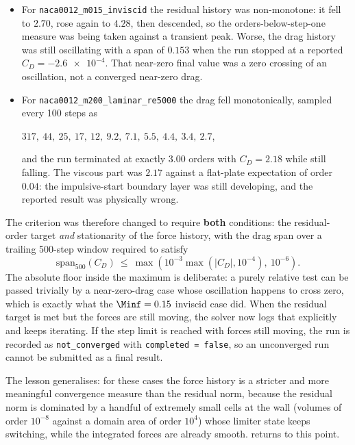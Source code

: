 \begin{itemize}
  \item For \texttt{naca0012\_m015\_inviscid} the residual history was
  non-monotone: it fell to $2.70$, rose again to $4.28$, then descended, so the
  orders-below-step-one measure was being taken against a transient peak. Worse,
  the drag history was still oscillating with a span of $0.153$ when the run
  stopped at a reported $C_D=\num{-2.6e-4}$. That near-zero final value was a
  zero crossing of an oscillation, not a converged near-zero drag.
  \item For \texttt{naca0012\_m200\_laminar\_re5000} the drag fell monotonically,
  sampled every 100 steps as
  \begin{center}
    $317,\ 44,\ 25,\ 17,\ 12,\ 9.2,\ 7.1,\ 5.5,\ 4.4,\ 3.4,\ 2.7$,
  \end{center}
  and the run terminated at exactly $3.00$ orders with $C_D=2.18$ while still
  falling. The viscous part was $2.17$ against a flat-plate expectation of order
  $0.04$: the impulsive-start boundary layer was still developing, and the reported
  result was physically wrong.
\end{itemize}

The criterion was therefore changed to require \textbf{both} conditions: the
residual-order target \emph{and} stationarity of the force history, with the drag
span over a trailing 500-step window required to satisfy
\begin{equation}
  \mathrm{span}_{500}(C_D)\ \le\
  \max\left(10^{-3}\max\left(|C_D|,10^{-4}\right),\ 10^{-6}\right).
  \label{eq:stationarity}
\end{equation}
The absolute floor inside the maximum is deliberate: a purely relative test can be
passed trivially by a near-zero-drag case whose oscillation happens to cross zero,
which is exactly what the $\Minf=0.15$ inviscid case did. When the residual target
is met but the forces are still moving, the solver now logs that explicitly and
keeps iterating. If the step limit is reached with forces still moving, the run is
recorded as \texttt{not\_converged} with \texttt{completed = false}, so an
unconverged run cannot be submitted as a final result.

The lesson generalises: for these cases the force history is a stricter and more
meaningful convergence measure than the residual norm, because the residual norm
is dominated by a handful of extremely small cells at the wall (volumes of order
$10^{-8}$ against a domain area of order $10^4$) whose limiter state keeps
switching, while the integrated forces are already smooth.
 returns to this point.

